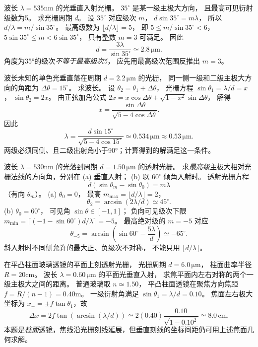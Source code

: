 波长 $\lambda=535$nm 的光垂直入射光栅。
$35^\circ$ 是某一级主极大方向，
且最高可见衍射级数为5。
求光栅周期 $d$。
\exsolution
设 $35^\circ$ 对应级次 $m$，
$d\sin35^\circ=m\lambda$，
所以 $d/\lambda=m/\sin35^\circ$。
最高级数为
$\lfloor d/\lambda\rfloor=5$，
即
$5\le m/\sin35^\circ<6$，
$5\sin35^\circ\le m<6\sin35^\circ$，
只有整数 $m=3$ 可满足。
因此
\[
\boxed{d=\frac{3\lambda}{\sin35^\circ}
\simeq2.8\,\mathrm{\mu m}}.
\]
\excheck 角度为35°的级次\emph{不等于最高级次5}，
应先用最高级次范围反推出 $m=3$。

波长未知的单色光垂直落在周期
$d=2.2\,\mathrm{\mu m}$ 的光栅，
同一侧一级和二级主极大方向的角距为
$\Delta\theta=15^\circ$。
求波长。
\exsolution
设 $\theta_2=\theta_1+\Delta\theta$，
光栅方程
$\sin\theta_1=\lambda/d=x$，
$\sin\theta_2=2x$。
由正弦加角公式
$2x=x\cos\Delta\theta+
\sqrt{1-x^2}\sin\Delta\theta$，
解得
\[
x=\frac{\sin\Delta\theta}
{\sqrt{5-4\cos\Delta\theta}}.
\]
因此
\[
\boxed{\lambda=
\frac{d\sin15^\circ}
{\sqrt{5-4\cos15^\circ}}
\simeq0.534\,\mathrm{\mu m}\approx0.53\,\mathrm{\mu m}}.
\]
\excheck 两级必须同侧、且二级出射角小于90°；计算得到的解满足这一条件。

波长 $\lambda=530$nm 的光落到周期
$d=1.50\,\mathrm{\mu m}$ 的透射光栅。
求\emph{最高级}主极大相对光栅法线的方向角，分别在
(a) 垂直入射；
(b) 以 $60^\circ$ 倾角入射时。
\exsolution
透射光栅方程
\[
d(\sin\theta_m-\sin\theta_0)=m\lambda
\]
（有向 $\theta_m$）。
(a) $\theta_0=0$，
最高 $m_{\max}=\lfloor d/\lambda\rfloor=2$，
\[
\boxed{\theta_2=\arcsin(2\lambda/d)
\simeq45^\circ}.
\]
(b) $\theta_0=60^\circ$，
可见角 $\sin\theta\in[-1,1]$；
负向可见级次下限
$m_{\min}=\lceil(-1-\sin60^\circ)d/\lambda\rceil=-5$。
最高绝对级的 $m=-5$ 对应
\[
\boxed{\theta_{-5}=
\arcsin\left(\sin60^\circ-\frac{5\lambda}{d}\right)
\simeq-65^\circ}.
\]
\excheck 斜入射时不同侧允许的最大正、负级次不对称，
不能只用 $\lfloor d/\lambda\rfloor$。

在平凸柱面玻璃透镜的平面上刻透射光栅，
光栅周期 $d=6.0\,\mathrm{\mu m}$，
柱面曲率半径 $R=20$cm。
波长 $\lambda=0.60\,\mathrm{\mu m}$ 的平面光垂直入射，
求焦平面内左右对称的两个一级主极大之间的距离。
\exsolution
普通玻璃取 $n\simeq1.50$，
平凸柱面透镜在聚焦方向焦距
$f=R/(n-1)=0.40$m。
一级衍射角满足
$\sin\theta_1=\lambda/d=0.10$。
焦面左右极大坐标为
$x_\pm=\pm f\tan\theta_1$，故
\[
\boxed{\Delta x=2f\tan(\arcsin(\lambda/d))
\simeq2(0.40)\frac{0.10}{\sqrt{1-0.10^2}}
\simeq8.0\,\mathrm{cm}}.
\]
\excheck 本题是\emph{柱面}透镜，焦线沿光栅刻线延展，但垂直刻线的坐标间距仍可用上述焦面几何求解。

